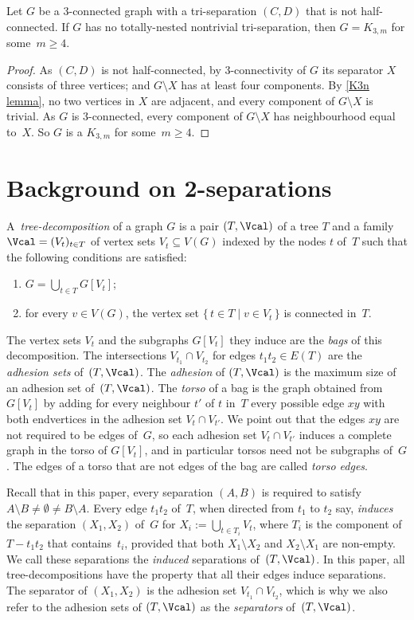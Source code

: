 \documentclass{aic}
\newcommand{\se}{\subseteq}
\theoremstyle{plain}
\theoremstyle{definition}
\theoremstyle{plain}
\theoremstyle{plain}
\newcommand{\sm}{\setminus}
\renewcommand{\ge}{\geqslant}
\begin{document}
\begin{cor}\label{conjunction}
Let $G$ be a 3-connected graph with a tri-separation $(C,D)$ that is not half-connected.
If $G$ has no totally-nested nontrivial tri-separation, then $G=K_{3,m}$ for some~$m\ge 4$.
\end{cor}
\begin{proof}
As  $(C,D)$ is not half-connected, by 3-connectivity of $G$  its separator $X$ consists of three vertices; and $G\sm X$ has at least four components.
By \autoref{K3n lemma}, no two vertices in $X$ are adjacent, and every component of $G\sm X$ is trivial.
As $G$ is 3-connected, every component of $G\sm X$ has neighbourhood equal to~$X$. 
So $G$ is a $K_{3,m}$ for some~$m\ge 4$.
\end{proof}

\section{Background on 2-separations}\label{sec:BackgroundOnTutte}

 A~\emph{tree-decomposition} of a graph $G$ is a pair $(T,\Vcal)$ of a tree $T$ and a family 
$\Vcal=(V_t)_{t\in T}$ of vertex sets $V_t\se V(G)$ indexed by the nodes $t$ of~$T$ such that the 
following conditions are satisfied:
\begin{enumerate}
    \item[(T1)] $G=\bigcup_{t\in T}G[V_t]$;
    \item[(T2)] for every $v\in V(G)$, the vertex set $\{\,t\in T\mid v\in V_t\,\}$ is connected 
in~$T$.
\end{enumerate}
The vertex sets $V_t$ and the subgraphs $G[V_t]$ they induce are the \emph{bags} of this
decomposition.
The intersections $V_{t_1}\cap V_{t_2}$ for edges $t_1 t_2\in E(T)$ are the \emph{adhesion sets} 
of~$(T,\Vcal)$.
The \emph{adhesion} of $(T,\Vcal)$ is the maximum size of an adhesion set of~$(T,\Vcal)$.
The \emph{torso} of a bag is the graph obtained from $G[V_t]$ by adding for every neighbour $t'$ of
$t$ in~$T$ every possible edge $xy$ with both endvertices in the adhesion set $V_t\cap V_{t'}$.
We point out that the edges $xy$ are not required to be edges of~$G$, so each adhesion set $V_t\cap 
V_{t'}$ induces a complete graph in the torso of $G[V_t]$, and in particular torsos need not be 
subgraphs of~$G$.
The edges of a torso that are not edges of the bag are called \emph{torso edges}.

Recall that in this paper, every separation $(A,B)$ is required to satisfy $A\sm B\neq \emptyset\neq B\sm A$.
Every edge $t_1 t_2$ of~$T$, when directed from $t_1$ to $t_2$ say, \emph{induces} the separation 
$(X_1,X_2)$ of~$G$ for $X_i:=\bigcup_{t\in T_i}V_t$, where $T_i$ is the component of $T-t_1 t_2$ 
that contains~$t_i$, provided that both $X_1\sm X_2$ and $X_2\sm X_1$ are non-empty.
We call these separations the \emph{induced} separations of~$(T,\Vcal)$.
In this paper, all tree-decompositions have the property that all their edges induce separations.
The separator of $(X_1,X_2)$ is the adhesion set $V_{t_1}\cap V_{t_2}$, which is why we also refer 
to the adhesion sets of $(T,\Vcal)$ as the \emph{separators} of~$(T,\Vcal)$.
\end{document}
